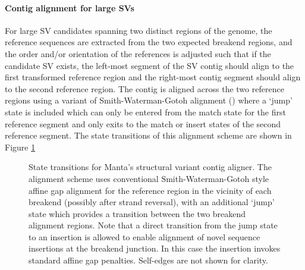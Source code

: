 \documentclass{article}
\begin{document}
\paragraph{Contig alignment for large SVs} For large SV candidates spanning two distinct regions of the genome, the reference sequences are extracted from the two expected breakend regions, and the order and/or orientation of the references is adjusted such that if the candidate SV exists, the left-most segment of the SV contig should align to the first transformed reference region and the right-most contig segment should align to the second reference region. The contig is aligned across the two reference regions using a variant of Smith-Waterman-Gotoh alignment (\cite{smith1981,gotoh1982}) where a `jump' state is included which can only be entered from the match state for the first reference segment and only exits to the match or insert states of the second reference segment. The state transitions of this alignment scheme are shown in Figure \ref{fig:jumpstate}

\begin{figure}[!tpb]
\centerline{
}
\caption{State transitions for Manta's structural variant contig aligner. The alignment scheme uses conventional Smith-Waterman-Gotoh style affine gap alignment for the reference region in the vicinity of each breakend (possibly after strand reversal), with an additional `jump' state which provides a transition between the two breakend alignment regions. Note that a direct transition from the jump state to an insertion is allowed to enable alignment of novel sequence insertions at the breakend junction. In this case the insertion invokes standard affine gap penalties. Self-edges are not shown for clarity.}
\label{fig:jumpstate}
\end{figure}
\end{document}

